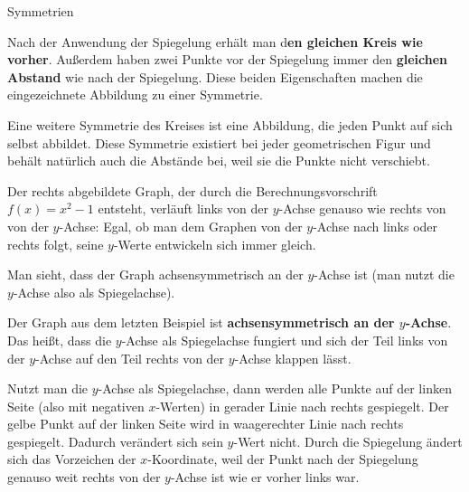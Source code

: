 \documentclass[../../main.tex]{subfiles}
\begin{document}
\begin{advanced}{Symmetrien}
\begin{advexample}{}
        Nach der Anwendung der Spiegelung erhält man d\textbf{en gleichen Kreis wie vorher}. Außerdem haben zwei Punkte vor der Spiegelung immer den \textbf{gleichen Abstand} wie nach der Spiegelung. Diese beiden Eigenschaften machen die eingezeichnete Abbildung zu einer Symmetrie.
        
        Eine weitere Symmetrie des Kreises ist eine Abbildung, die jeden Punkt auf sich selbst abbildet. Diese Symmetrie existiert bei jeder geometrischen Figur und behält natürlich auch die Abstände bei, weil sie die Punkte nicht verschiebt.
    \end{advexample}
\end{advanced}

\begin{example}{}
    Der rechts abgebildete Graph, der durch die Berechnungsvorschrift $f(x)=x^2-1$ entsteht, verläuft links von der $y$-Achse genauso wie rechts von von der $y$-Achse: Egal, ob man dem Graphen von der $y$-Achse nach links oder rechts folgt, seine $y$-Werte entwickeln sich immer gleich.
    
    Man sieht, dass der Graph achsensymmetrisch an der $y$-Achse ist (man nutzt die $y$-Achse also als Spiegelachse).
\end{example}

Der Graph aus dem letzten Beispiel ist \textbf{achsensymmetrisch an der $y$-Achse}. Das heißt, dass die $y$-Achse als Spiegelachse fungiert und sich der Teil links von der $y$-Achse auf den Teil rechts von der $y$-Achse klappen lässt.


Nutzt man die $y$-Achse als Spiegelachse, dann werden alle Punkte auf der linken Seite (also mit negativen $x$-Werten) in gerader Linie nach rechts gespiegelt. Der gelbe Punkt auf der linken Seite wird in waagerechter Linie nach rechts gespiegelt. Dadurch verändert sich sein $y$-Wert nicht. Durch die Spiegelung ändert sich das Vorzeichen der $x$-Koordinate, weil der Punkt nach der Spiegelung genauso weit rechts von der $y$-Achse ist wie er vorher links war.
\end{document}
